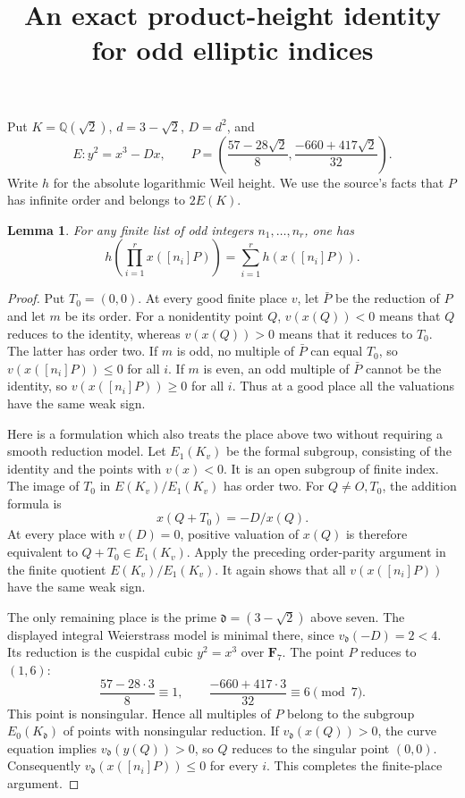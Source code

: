 \documentclass[11pt]{article}
\newtheorem{lemma}{Lemma}
\newcommand{\Q}{\mathbb Q}
\begin{document}
\title{An exact product-height identity for odd elliptic indices}
\author{}\date{}\maketitle
Put $K=\Q(\sqrt2)$, $d=3-\sqrt2$, $D=d^2$, and
\[
 E:y^2=x^3-Dx,\qquad
 P=\left(\frac{57-28\sqrt2}{8},\frac{-660+417\sqrt2}{32}\right).
\]
Write $h$ for the absolute logarithmic Weil height. We use the source's
facts that $P$ has infinite order and belongs to $2E(K)$.

\begin{lemma}\label{lem:oddproduct}
For any finite list of odd integers $n_1,\ldots,n_r$, one has
\[
 h\!\left(\prod_{i=1}^r x([n_i]P)\right)
 =\sum_{i=1}^r h(x([n_i]P)).
\]
\end{lemma}
\begin{proof}
Put $T_0=(0,0)$. At every good finite place $v$, let $\bar P$ be the
reduction of $P$ and let $m$ be its order. For a nonidentity point $Q$,
$v(x(Q))<0$ means that $Q$ reduces to the identity, whereas
$v(x(Q))>0$ means that it reduces to $T_0$. The latter has order two.
If $m$ is odd, no multiple of $\bar P$ can equal $T_0$, so
$v(x([n_i]P))\le0$ for all $i$. If $m$ is even, an odd multiple of
$\bar P$ cannot be the identity, so $v(x([n_i]P))\ge0$ for all $i$.
Thus at a good place all the valuations have the same weak sign.

Here is a formulation which also treats the place above two without
requiring a smooth reduction model. Let $E_1(K_v)$ be the formal
subgroup, consisting of the identity and the points with $v(x)<0$.
It is an open subgroup of finite index. The image of $T_0$ in
$E(K_v)/E_1(K_v)$ has order two. For $Q\ne O,T_0$, the addition formula is
\[
 x(Q+T_0)=-D/x(Q).
\]
At every place with $v(D)=0$, positive valuation of $x(Q)$ is therefore
equivalent to $Q+T_0\in E_1(K_v)$. Apply the preceding order-parity
argument in the finite quotient $E(K_v)/E_1(K_v)$. It again shows that
all $v(x([n_i]P))$ have the same weak sign.

The only remaining place is the prime $\mathfrak d=(3-\sqrt2)$ above
seven. The displayed integral Weierstrass model is minimal there,
since $v_{\mathfrak d}(-D)=2<4$. Its reduction is the cuspidal cubic
$y^2=x^3$ over $\mathbf F_7$. The point $P$ reduces to $(1,6)$:
\[
 \frac{57-28\cdot3}{8}\equiv1,\qquad
 \frac{-660+417\cdot3}{32}\equiv6\pmod7.
\]
This point is nonsingular. Hence all multiples of $P$ belong to the
subgroup $E_0(K_{\mathfrak d})$ of points with nonsingular reduction.
If $v_{\mathfrak d}(x(Q))>0$, the curve equation implies
$v_{\mathfrak d}(y(Q))>0$, so $Q$ reduces to the singular point $(0,0)$.
Consequently $v_{\mathfrak d}(x([n_i]P))\le0$ for every $i$.
This completes the finite-place argument.


\end{proof}
\end{document}
